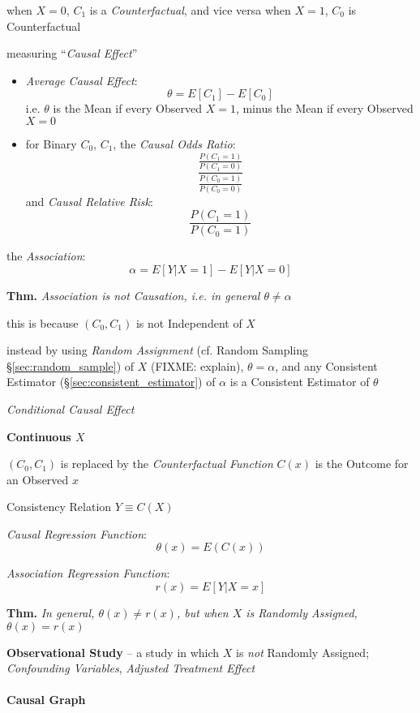 when $X = 0$, $C_1$ is a \emph{Counterfactual}, and vice versa when $X = 1$,
$C_0$ is Counterfactual

measuring ``\emph{Causal Effect}''

\begin{itemize}
  \item \emph{Average Causal Effect}:
    \[
      \theta = E[C_1] - E[C_0]
    \]
    i.e. $\theta$ is the Mean if every Observed $X = 1$, minus the Mean if every
    Observed $X = 0$

  \item for Binary $C_0$, $C_1$, the \emph{Causal Odds Ratio}:
    \[
      \frac{
        \frac{P(C_1 = 1)}{P(C_1 = 0)}
      }{
        \frac{P(C_0 = 1)}{P(C_0 = 0)}
      }
    \]
    and \emph{Causal Relative Risk}:
    \[
      \frac{P(C_1 = 1)}{P(C_0 = 1)}
    \]
\end{itemize}

the \emph{Association}:
\[
  \alpha = E[Y | X = 1] - E[Y | X = 0]
\]

\textbf{Thm.} \emph{Association is not Causation, i.e. in general
$\theta \neq \alpha$}

this is because $(C_0, C_1)$ is not Independent of $X$

instead by using \emph{Random Assignment} (cf. Random Sampling
\S\ref{sec:random_sample}) of $X$ (FIXME: explain), $\theta = \alpha$, and any
Consistent Estimator (\S\ref{sec:consistent_estimator}) of $\alpha$ is a
Consistent Estimator of $\theta$

\emph{Conditional Causal Effect}

\textbf{Continuous $X$}

$(C_0, C_1)$ is replaced by the \emph{Counterfactual Function} $C(x)$ is the
Outcome for an Observed $x$

Consistency Relation $Y \equiv C(X)$

\emph{Causal Regression Function}:
\[
  \theta(x) = E(C(x))
\]

\emph{Association Regression Function}:
\[
  r(x) = E[Y | X = x]
\]

\textbf{Thm.} \emph{In general, $\theta(x) \neq r(x)$, but when $X$ is Randomly
  Assigned, $\theta(x) = r(x)$}


\textbf{Observational Study} -- a study in which $X$ is \emph{not} Randomly
Assigned; \emph{Confounding Variables}, \emph{Adjusted Treatment Effect}



\paragraph{Causal Graph}\label{sec:causal_graph}\hfill

